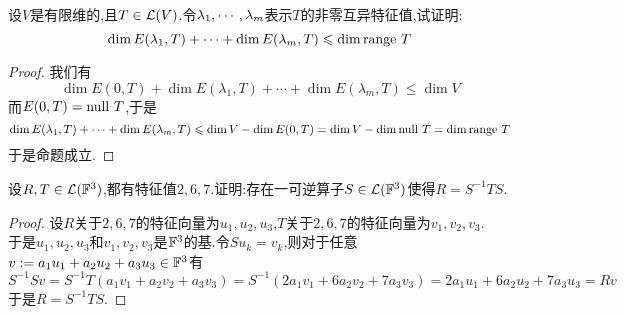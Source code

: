 \documentclass{ctexart}
\begin{document}
\begin{problem}[8.]
    设$V$是有限维的,且$T\in\mathcal{L}(V)$.令${\lambda}_1,\cdots,{\lambda}_{m}$表示$T$的非零互异特征值,试证明:
    \[\dim E(\lambda_1,T)+\cdots+\dim E(\lambda_m,T)\leqslant\dim\text{range } T\]
\end{problem}
\begin{proof}
    我们有
    \[\dim E(0,T)+\dim E(\lambda_1,T)+\cdots+\dim E(\lambda_m,T)\leqslant\dim V\]
    而$E(0,T)=\text{null } T$,于是
    \[\dim E(\lambda_1,T)+\cdots+\dim E(\lambda_m,T)\leqslant\dim V-\dim E(0,T)=\dim V-\dim\text{null } T=\dim\text{range } T\]
    于是命题成立.
\end{proof}
\begin{problem}[9.]
    设$R,T\in\mathcal{L}(\mathbb{F}^3)$,都有特征值$2,6,7$.证明:存在一可逆算子$S\in\mathcal{L}(\mathbb{F}^3)$使得$R=S^{-1}TS$.
\end{problem}
\begin{proof}
    设$R$关于$2,6,7$的特征向量为$u_1,u_2,u_3$,$T$关于$2,6,7$的特征向量为$v_1,v_2,v_3$.\\
    于是$u_1,u_2,u_3$和$v_1,v_2,v_3$是$\mathbb{F}^3$的基.令$Su_k=v_k$,则对于任意$v:=a_1u_1+a_2u_2+a_3u_3\in\mathbb{F}^3$有
    \[S^{-1}Sv=S^{-1}T(a_1v_1+a_2v_2+a_3v_3)=S^{-1}(2a_1v_1+6a_2v_2+7a_3v_3)=2a_1u_1+6a_2u_2+7a_3u_3=Rv\]
    于是$R=S^{-1}TS$.
\end{proof}
\begin{problem}[10.]
    
\end{problem}
\end{document}
